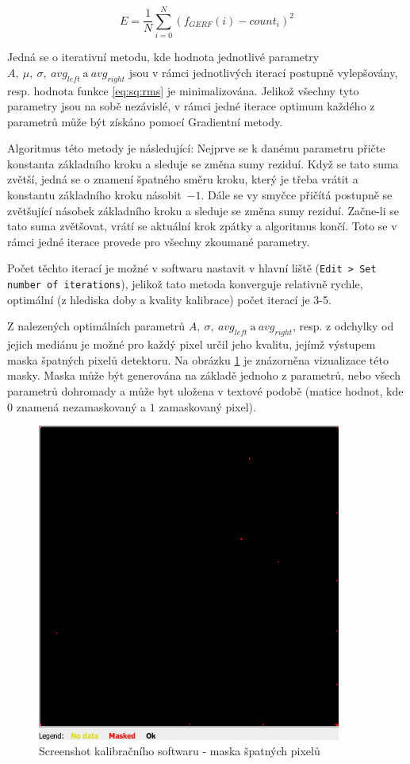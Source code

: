 \begin{equation}\label{eq:sq:rms}
	E = \frac{1}{N} \sum_{i=0}^{N}(f_{GERF}(i) - count_i)^2
\end{equation}

Jedná se o iterativní metodu, kde hodnota jednotlivé parametry $A,~\mu,~\sigma,~avg_{left}~\text{a}~avg_{right}$ jsou v rámci jednotlivých iterací postupně vylepšovány, resp. hodnota funkce \ref{eq:sq:rms} je minimalizována. Jelikož všechny tyto parametry jsou na sobě nezávislé, v rámci jedné iterace optimum každého z parametrů může být získáno pomocí Gradientní metody.

Algoritmus této metody je následující: Nejprve se k danému parametru přičte konstanta základního kroku a sleduje se změna sumy reziduí. Když se tato suma zvětší, jedná se o znamení špatného směru kroku, který je třeba vrátit a konstantu základního kroku násobit~$-1$. Dále se vy smyčce přičítá postupně se zvětšující násobek základního kroku a sleduje se změna sumy reziduí. Začne-li se tato suma zvětšovat, vrátí se aktuální krok zpátky a algoritmus končí. Toto se v rámci jedné iterace provede pro všechny zkoumané parametry.

Počet těchto iterací je možné v softwaru nastavit v hlavní liště (\texttt{Edit > Set number of iterations}), jelikož tato metoda konverguje relativně rychle, optimální (z hlediska doby a kvality kalibrace) počet iterací je 3-5.

Z nalezených optimálních parametrů $A,~\sigma,~avg_{left}~\text{a}~avg_{right}$, resp. z odchylky od jejich mediánu je možné pro každý pixel určil jeho kvalitu, jejímž výstupem maska špatných pixelů detektoru. Na obrázku \ref{fig:calib:sw_mask} je znázorněna vizualizace této masky. Maska může být generována na základě jednoho z parametrů, nebo všech parametrů dohromady a může byt uložena v textové podobě (matice hodnot, kde $0$ znamená nezamaskovaný a $1$ zamaskovaný pixel).

\begin{figure}[th!]
	\begin{center}
		\includegraphics[width=10cm]{figures/calibsw_mask.png}
		\caption{Screenshot kalibračního softwaru - maska špatných pixelů}
		\label{fig:calib:sw_mask}
	\end{center}
\end{figure}


